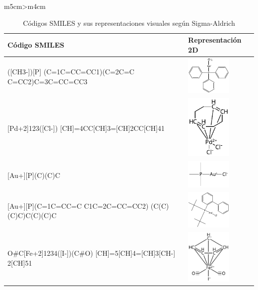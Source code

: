 \begin{landscape}
\begin{table}
\begin{minipage}{.5\linewidth}
\begin{tabular}{m{5cm}>{\centering\arraybackslash}m{4cm}}
        \hline
        \end{tabular}
    \caption{Códigos SMILES y sus representaciones visuales según Sigma-Aldrich}
    \label{tabla:tabla_peq_intro_sigmaAldrich}
  \end{minipage}%
  \begin{minipage}{.5\linewidth}
    \centering
    \begin{tabular}{m{5cm}>{\centering\arraybackslash}m{4cm}}
        \hline
        \textbf{Código SMILES} & \textbf{Representación 2D} \\
        \hline
        [Au+]([CH3-])[P] (C=1C=CC=CC1)(C=2C=C C=CC2)C=3C=CC=CC3 & \includegraphics[width=2.2cm]{imagenes/sciFinder/pdf/Methyl(triphenylphosphine)gold(I).pdf} \\
        \hline
        [Cl-][Pd+2]123([Cl-]) [CH]=4CC[CH]3=[CH]2CC[CH]41 & \includegraphics[width=2.2cm]{imagenes/sciFinder/pdf/Dichloro(1,5-cyclooctadiene)palladium(II).pdf} \\
        \hline
        [Cl-][Au+][P](C)(C)C & \includegraphics[width=2.2cm]{imagenes/sciFinder/pdf/Chloro(trimethylphosphine)gold(I).pdf} \\
        \hline
        [Cl-][Au+][P](C=1C=CC=C C1C=2C=CC=CC2) (C(C)(C)C)C(C)(C)C & \includegraphics[width=2.2cm]{imagenes/sciFinder/pdf/Chloro[(1,1-biphenyl-2-yl)di-tert-butylphosphine]gold(I).pdf} \\
        \hline
        O\#C[Fe+2]1234([I-])(C\#O) [CH]=5[CH]4=[CH]3[CH-] 2[CH]51 & \includegraphics[width=2.2cm]{imagenes/sciFinder/pdf/Dicarbonylcyclopentadienyliodoiron(II).pdf} \\

\end{tabular}
\end{minipage}
\end{table}
\end{landscape}
